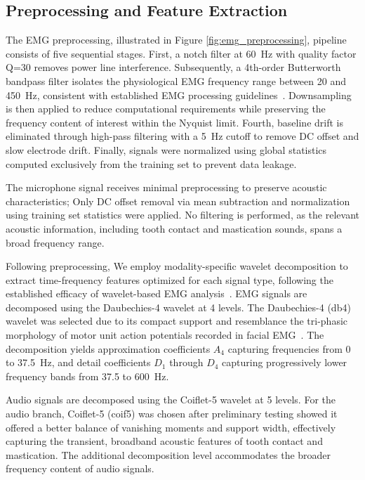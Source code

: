 \documentclass[pdflatex,sn-vancouver-num, iicol]{sn-jnl}
\begin{document}
\subsection{Preprocessing and Feature Extraction}

The EMG preprocessing, illustrated in Figure \ref{fig:emg_preprocessing}, pipeline consists of five sequential stages. First, a notch filter at 60~Hz with quality factor Q=30 removes power line interference. Subsequently, a 4th-order Butterworth bandpass filter isolates the physiological EMG frequency range between 20 and 450~Hz, consistent with established EMG processing guidelines~\cite{chowdhury2013surface}. Downsampling is then applied to reduce computational requirements while preserving the frequency content of interest within the Nyquist limit. Fourth, baseline drift is eliminated through high-pass filtering with a 5~Hz cutoff to remove DC offset and slow electrode drift. Finally, signals were normalized using global statistics computed exclusively from the training set to prevent data leakage.

The microphone signal receives minimal preprocessing to preserve acoustic characteristics; Only DC offset removal via mean subtraction and normalization using training set statistics were applied. No filtering is performed, as the relevant acoustic information, including tooth contact and mastication sounds, spans a broad frequency range.



Following preprocessing, We employ modality-specific wavelet decomposition to extract time-frequency features optimized for each signal type, following the established efficacy of wavelet-based EMG analysis~\cite{phinyomark2012feature}. EMG signals are decomposed using the Daubechies-4 wavelet at 4 levels. 
The Daubechies-4 (db4) wavelet was selected due to its compact support and resemblance the tri-phasic morphology of motor unit action potentials recorded in facial EMG~\cite{englehart2003robust}. The decomposition yields approximation coefficients $A_4$ capturing frequencies from 0 to 37.5~Hz, and detail coefficients $D_1$ through $D_4$ capturing progressively lower frequency bands from 37.5 to 600~Hz.

Audio signals are decomposed using the Coiflet-5 wavelet at 5 levels. For the audio branch, Coiflet-5 (coif5) was chosen after preliminary testing showed it offered a better balance of vanishing moments and support width, effectively capturing the transient, broadband acoustic features of tooth contact and mastication. The additional decomposition level accommodates the broader frequency content of audio signals. \cite{bharathi2025unveiling}
\end{document}
